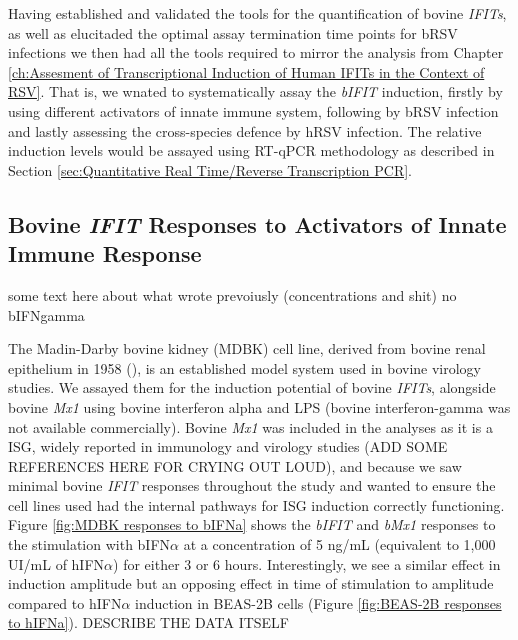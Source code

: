 Having established and validated the tools for the quantification of bovine \textit{IFITs}, as well as elucitaded the optimal assay termination time points for bRSV infections we then had all the tools required to mirror the analysis from Chapter \ref{ch:Assesment of Transcriptional Induction of Human IFITs in the Context of RSV}. That is, we wnated to systematically assay the \textit{bIFIT} induction, firstly by using different activators of innate immune system, following by bRSV infection and lastly assessing the cross-species defence by hRSV infection. The relative induction levels would be assayed using RT-qPCR methodology as described in Section \ref{sec:Quantitative Real Time/Reverse Transcription PCR}. 



\subsection{Bovine \textit{IFIT} Responses to Activators of Innate Immune Response} \label{subsec:Bovine IFIT Responses to Activators of Innate Immune Response}
some text here about what wrote prevoiusly (concentrations and shit) no bIFNgamma


The Madin-Darby bovine kidney (MDBK) cell line, derived from bovine renal epithelium in 1958 (\cite{Madin1958EstablishedOrigin}), is an established model system used in bovine virology studies. We assayed them for the induction potential of bovine \textit{IFITs}, alongside bovine \textit{Mx1} using bovine interferon alpha and LPS (bovine interferon-gamma was not available commercially). Bovine \textit{Mx1} was included in the analyses as it is a ISG, widely reported in immunology and virology studies (ADD SOME REFERENCES HERE FOR CRYING OUT LOUD), and because we saw minimal bovine \textit{IFIT} responses throughout the study and wanted to ensure the cell lines used had the internal pathways for ISG induction correctly functioning. Figure \ref{fig:MDBK responses to bIFNa} shows the \textit{bIFIT} and \textit{bMx1} responses to the stimulation with bIFN\(\alpha\) at a concentration of 5 ng/mL (equivalent to 1,000 UI/mL of hIFN\(\alpha\)) for either 3 or 6 hours. Interestingly, we see a similar effect in induction amplitude but an opposing effect in time of stimulation to amplitude compared to hIFN\(\alpha\) induction in BEAS-2B cells (Figure \ref{fig:BEAS-2B responses to hIFNa}). DESCRIBE THE DATA ITSELF

